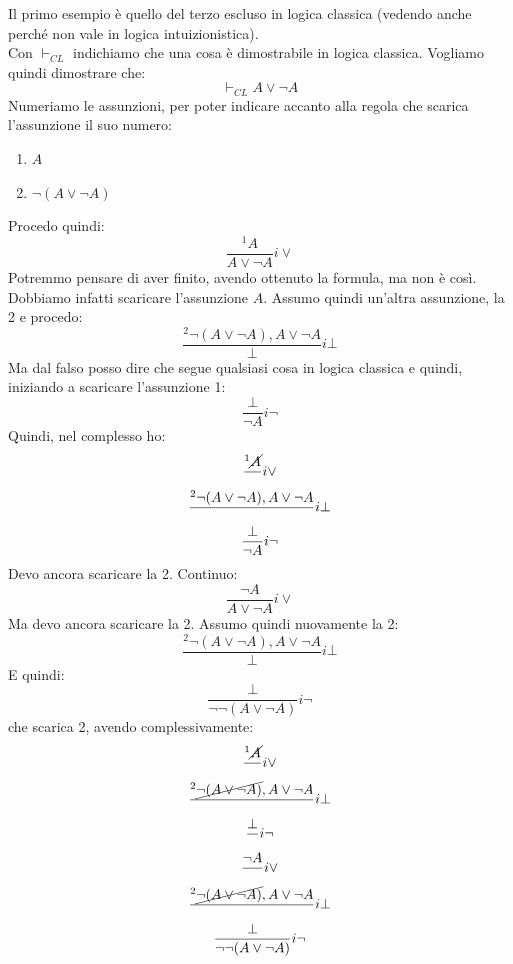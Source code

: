 \documentclass[a4paper,12pt, oneside]{book}
\begin{document}
\begin{esempio}
  Il primo esempio è quello del terzo escluso in logica classica (vedendo anche
  perché non vale in logica intuizionistica).\\
  Con $\vdash_{CL}$ indichiamo che una cosa è dimostrabile in logica
  classica. Vogliamo quindi dimostrare che:
  \[\vdash_{CL}A\lor \neg A\]
  Numeriamo le assunzioni, per poter indicare accanto alla regola che scarica
  l'assunzione il suo numero:
  \begin{enumerate}
    \item $A$
    \item $\neg(A\lor \neg A)$
  \end{enumerate}
  Procedo quindi:
  \[\frac{^1A}{A\lor \neg A}i\lor\]
  Potremmo pensare di aver finito, avendo ottenuto la formula, ma non è
  così. Dobbiamo infatti scaricare l'assunzione $A$. Assumo quindi un'altra
  assunzione, la 2 e procedo:
  \[\frac{^2\neg(A\lor \neg A), A\lor \neg A}{\bot}i\bot\]
  Ma dal falso posso dire che segue qualsiasi cosa in logica classica e quindi,
  iniziando a scaricare l'assunzione 1:
  \[\frac{\bot}{\neg A}i\neg\]
  Quindi, nel complesso ho:
  \begin{gather*}
    \frac{^1\cancel{A}}{}i\lor\\
    \frac{^2\neg(A\lor \neg A), A\lor \neg A}{}i\bot\\
    \frac{\bot}{\neg A}i\neg
  \end{gather*}
  Devo ancora scaricare la 2. Continuo:
  \[\frac{\neg A}{A\lor \neg A}i\lor\]
  Ma devo ancora scaricare la 2. Assumo quindi nuovamente la 2:
  \[\frac{^2\neg(A\lor \neg A), A\lor \neg A}{\bot}i\bot\]
  E quindi:
  \[\frac{\bot}{\neg \neg(A\lor \neg A)}i\neg\]
  che scarica 2, avendo complessivamente:
  \begin{gather*}
    \frac{^1\cancel{A}}{}i\lor\\
    \frac{^2\cancel{\neg(A\lor \neg A)}, A\lor \neg A}{}i\bot\\
    \frac{\bot}{}i\neg\\
    \frac{\neg A}{}i\lor\\
    \frac{^2\cancel{\neg(A\lor \neg A)}, A\lor \neg A}{}i\bot\\
    \frac{\bot}{\neg \neg(A\lor \neg A)}i\neg
  \end{gather*}


\end{esempio}
\end{document}
